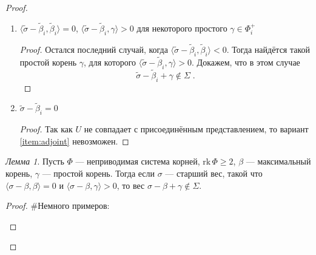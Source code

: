 \documentclass[10pt]{article}
\theoremstyle{remark}
\newtheorem{lm}{Лемма}
\renewcommand{\ge}{\geqslant}
\begin{document}
\begin{proof}
\begin{enumerate}
\begin{proof}
Далее ($\gamma$ и $\beta$ так же предполагаются ортогональными):
\begin{multline*}
[x_{-\delta}(1), [x_{-\gamma}(1), [x_{-\gamma}(1),x_\beta(\xi) u]]] = \\ =
[x_{-\delta}(1), x_{\delta-\gamma}(N_{-\gamma,\beta,1,1} N_{-\gamma,\delta,1,1} \, \xi)
 \; \varepsilon^2_{-\gamma}(u) \, u_2] = \\ =
[x_{-\delta}(1), x_{\delta-\gamma}(N_{-\gamma,\beta,1,1} N_{-\gamma,\delta,1,1} \, \xi)] \;
{}^{x_{\delta-\gamma}(N_{-\gamma,\beta,1,1} N_{-\gamma,\delta,1,1} \, \xi)} [x_{-\delta}(1), \varepsilon^2_{-\gamma}(u) \, u_2]
\end{multline*}



\end{proof}
\item $\langle\widetilde\sigma - \widetilde\beta_i, \widetilde\beta_i\rangle = 0$, $\langle\widetilde\sigma - \widetilde\beta_i, \gamma\rangle > 0$ для некоторого простого $\gamma \in \Phi_i^+$
\begin{proof}
Остался последний случай, когда $\langle\widetilde\sigma - \widetilde\beta_i, \widetilde\beta_i\rangle < 0$. Тогда найдётся такой простой корень $\gamma$, для которого $\langle\widetilde\sigma - \widetilde\beta_i, \gamma\rangle > 0$. Докажем, что в этом случае
$$
\widetilde\sigma-\widetilde\beta_i+\gamma \notin \Sigma \; .
$$
\end{proof}
\item \label{item:adjoint} $\widetilde\sigma - \widetilde\beta_i = 0$
\begin{proof}
Так как $U$ не совпадает с присоединённым представлением, то вариант \ref{item:adjoint} невозможен.
\end{proof}
\end{enumerate}


\begin{lm}
Пусть $\Phi$ --- неприводимая система корней, $\mathrm{rk}\,\Phi \ge 2$, $\beta$ --- максимальный корень, $\gamma$ --- простой корень. Тогда если $\sigma$ --- старший вес, такой что $\langle\sigma-\beta,\beta\rangle=0$ и $\langle\sigma-\beta,\gamma\rangle>0$, то вес $\sigma-\beta+\gamma \notin \Sigma$.
\end{lm}
\begin{proof}
\#Немного примеров:

\begin{center}
\newcommand{\point}[1]{node (#1) [circle,inner sep=1,fill] {}}
\newcommand{\pointroot}[1]{node (#1) [circle,inner sep=2,fill=blue] {}}
\newcommand{\pointweight}[1]{node (#1) [circle,inner sep=2,fill=olive] {}}
\newcommand{\pointnotweight}[1]{node (#1) [circle,inner sep=2,fill=red] {}}


\end{center}
\end{proof}
\end{proof}
\end{document}
